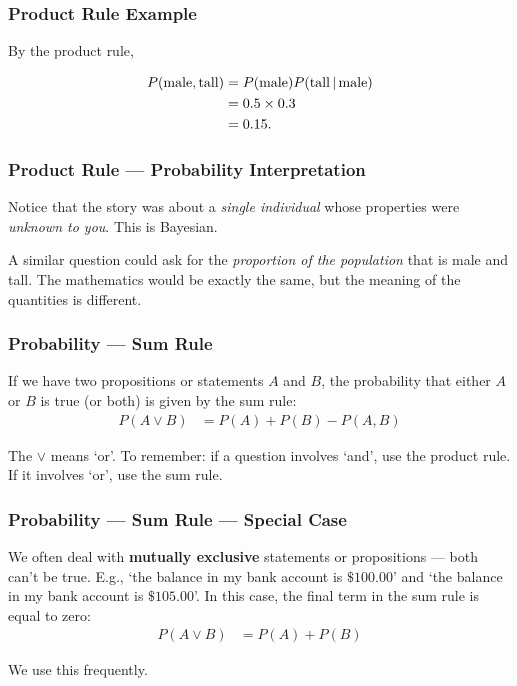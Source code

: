 \documentclass{beamer}
\newcommand{\given}{\,|\,}
\begin{document}
\begin{frame}
\frametitle{Product Rule Example}
By the product rule,

\begin{align}
P(\textnormal{male}, \textnormal{tall})
    &= P(\textnormal{male})P(\textnormal{tall} \given \textnormal{male})\\
    &= 0.5 \times 0.3\\
    &= 0.15.
\end{align}

\end{frame}

\begin{frame}
\frametitle{Product Rule --- Probability Interpretation}
Notice that the story was about a {\em single individual} whose properties
were {\em unknown to you}. This is Bayesian.\\[0.5em]\pause

A similar question could ask for the
{\em proportion of the population} that is male and tall.
The mathematics would be exactly the same, but the meaning of the quantities
is different.
\end{frame}

\begin{frame}
\frametitle{Probability --- Sum Rule}
If we have two propositions or
statements
 $A$ and $B$, the probability that either $A$ or $B$ is true (or both)
is given by the sum rule:
\begin{align}
P(A \vee B) &= P(A) + P(B) - P(A, B)
\end{align}\pause

The $\vee$ means `or'. To remember: if a question involves
`and', use the product rule. If it involves `or', use the sum rule.

\end{frame}

\begin{frame}
\frametitle{Probability --- Sum Rule --- Special Case}
We often deal with {\bf mutually exclusive} statements or propositions ---
both can't be true. E.g., `the balance in my bank account is $\$100.00$'
and `the balance in my bank account is $\$105.00$'.
In this case, the final term in the sum rule is equal to zero:
\begin{align}
P(A \vee B) &= P(A) + P(B)
\end{align}\pause

We use this frequently.


\end{frame}
\end{document}

